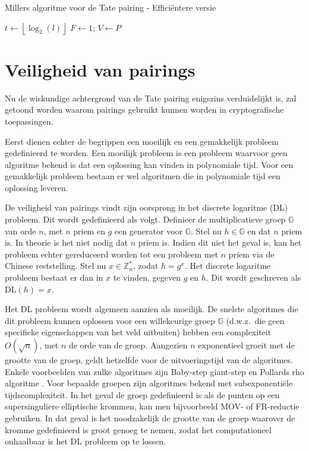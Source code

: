 \begin{algorithm}[h]
	\caption{Millers algoritme voor de Tate pairing - Effici\"entere versie}
	\label{algoritme-pairings-miller-beter}
	$t \gets \left\lfloor \log _2 (l) \right\rfloor$\;
	$F \gets 1$; $V \gets P$\;	
\end{algorithm}

\section{Veiligheid van pairings}

Nu de wiskundige achtergrond van de Tate pairing enigszins verduidelijkt is, zal getoond worden waarom pairings gebruikt kunnen worden in cryptografische toepassingen.

Eerst dienen echter de begrippen een moeilijk en een gemakkelijk probleem gedefinieerd te worden. Een moeilijk probleem is een probleem waarvoor geen algoritme bekend is dat een oplossing kan vinden in polynomiale tijd. Voor een gemakkelijk probleem bestaan er wel algoritmen die in polynomiale tijd een oplossing leveren.

De veiligheid van pairings vindt zijn oorsprong in het discrete logaritme (DL) probleem. Dit wordt gedefinieerd als volgt. Definieer de multiplicatieve groep $\mathbb{G}$ van orde $n$, met $n$ priem en $g$ een generator voor $\mathbb{G}$. Stel nu $h \in \mathbb{G}$ en dat $n$ priem is. In theorie is het niet nodig dat $n$ priem is. Indien dit niet het geval is, kan het probleem echter gereduceerd worden tot een probleem met $n$ priem via de Chinese reststelling. Stel nu $x \in \mathbb{Z}_n^*$, zodat $h = g^x$. Het discrete logaritme probleem bestaat er dan in $x$ te vinden, gegeven $g$ en $h$. Dit wordt geschreven als DL$(h) = x$.

Het DL probleem wordt algemeen aanzien als moeilijk. De snelste algoritmes die dit probleem kunnen oplossen voor een willekeurige groep $\mathbb{G}$ (d.w.z.\ die geen specifieke eigenschappen van het veld uitbuiten) hebben een complexiteit $O(\sqrt{n})$, met $n$ de orde van de groep. Aangezien $n$ exponentieel groeit met de grootte van de groep, geldt hetzelfde voor de uitvoeringstijd van de algoritmes. Enkele voorbeelden van zulke algoritmes zijn Baby-step giant-step \cite{baby-step} en Pollards rho algoritme \cite{pollard-rho}. Voor bepaalde groepen zijn algoritmes bekend met subexponenti\"ele tijdscomplexiteit. In het geval de groep gedefinieerd is als de punten op een supersinguliere elliptische krommen, kan men bijvoorbeeld MOV- \cite{mov} of FR-reductie \cite{fr} gebruiken. In dat geval is het noodzakelijk de grootte van de groep waarover de kromme gedefinieerd is groot genoeg te nemen, zodat het computationeel onhaalbaar is het DL probleem op te lossen.

